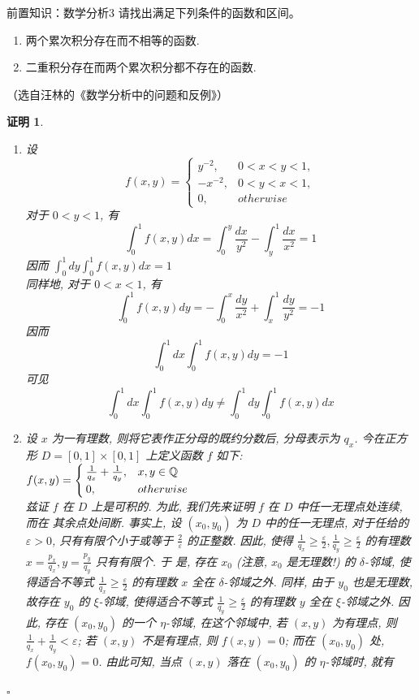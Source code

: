 \documentclass[UTF8, a4paper, 12pt, oneside, twocolumn]{article}
\numberwithin{equation}{section}
\numberwithin{figure}{section}
\numberwithin{table}{section}
\def\dint{\displaystyle\int}
\newtheorem*{Proof}{证明}
\newif\ifproof
\newenvironment{Ex}[1][]{\prooffalse \begin{EExercise}{#1}{}}%
{\ifproof%
\hfill\ensuremath{\square}\end{Proof}%
\fi%
\end{EExercise}}
\newcommand{\pr}{\tcblower \begin{Proof}\prooftrue }
\begin{document}
\begin{Ex}[前置知识：数学分析3]
请找出满足下列条件的函数和区间。
\begin{enumerate}
\item 两个累次积分存在而不相等的函数.
\item 二重积分存在而两个累次积分都不存在的函数.
\end{enumerate}
（选自汪林的《数学分析中的问题和反例》）
\pr
\begin{enumerate}
\item 设
$$
f(x, y)= \begin{cases}y^{-2}, & 0<x<y<1, \\ -x^{-2}, & 0<y<x<1, \\ 0, & otherwise\end{cases}
$$
对于 $0<y<1$, 有
$$
\int_0^1 f(x, y) d x=\int_0^y \frac{d x}{y^2}-\int_y^1 \frac{d x}{x^2}=1
$$
因而
$
\dint_0^1 d y \int_0^1 f(x, y) d x=1
$\\
同样地, 对于 $0<x<1$, 有
$$
\int_0^1 f(x, y) d y=-\int_0^x \frac{d y}{x^2}+\int_x^1 \frac{d y}{y^2}=-1
$$
因而
$$
\int_0^1 d x \int_0^1 f(x, y) d y=-1
$$
可见
$$
\int_0^1 d x \int_0^1 f(x, y) d y \neq \int_0^1 d y \int_0^1 f(x, y) d x
$$
\item 
设 $x$ 为一有理数, 则将它表作正分母的既约分数后, 分母表示为 $q_x$. 今在正方形 $D=[0,1] \times[0,1]$ 上定义函数 $f$ 如下:\\
$
f(x, y)= \begin{cases}\frac{1}{q_x}+\frac{1}{q_y}, & x,y\in\mathbb{Q} \\ 0, & otherwise\end{cases}
$\\
兹证 $f$ 在 $D$ 上是可积的. 为此, 我们先来证明 $f$ 在 $D$ 中任一无理点处连续, 而在 其余点处间断.
事实上, 设 $\left(x_0, y_0\right)$ 为 $D$ 中的任一无理点, 对于任给的 $\varepsilon>0$, 只有有限个小于或等于 $\frac{2}{\varepsilon}$ 的正整数. 因此, 使得 $\frac{1}{q_x} \geqslant \frac{\varepsilon}{2}, \frac{1}{q_y} \geqslant \frac{\varepsilon}{2}$ 的有理数 $x=\frac{p_x}{q_x}, y=\frac{p_y}{q_y}$ 只有有限个. 于 是, 存在 $x_0$ (注意, $x_0$ 是无理数!) 的 $\delta$-邻域, 使得适合不等式 $\frac{1}{q_x} \geqslant \frac{\varepsilon}{2}$ 的有理数 $x$ 全在 $\delta$-邻域之外. 同样, 由于 $y_0$ 也是无理数, 故存在 $y_0$ 的 $\xi$-邻域, 使得适合不等式 $\frac{1}{q_y} \geqslant \frac{\varepsilon}{2}$ 的有理数 $y$ 全在 $\xi$-邻域之外. 因此, 存在 $\left(x_0, y_0\right)$ 的一个 $\eta$-邻域, 在这个邻域中, 若 $(x, y)$ 为有理点, 则 $\frac{1}{q_x}+\frac{1}{q_y}<\varepsilon$; 若 $(x, y)$ 不是有理点, 则 $f(x, y)=0$; 而在 $\left(x_0, y_0\right)$ 处, $f\left(x_0, y_0\right)=0$. 由此可知, 当点 $(x, y)$ 落在 $\left(x_0, y_0\right)$ 的 $\eta$-邻域时, 就有\\

\end{enumerate}
\end{Ex}
\end{document}
